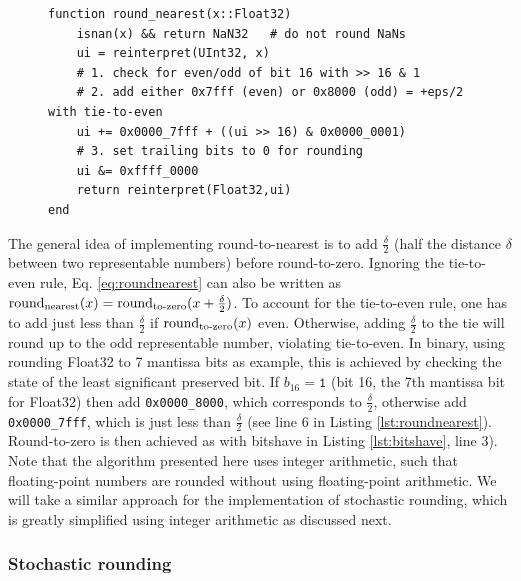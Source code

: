 \begin{figure}[tbhp]
\begin{lstlisting}[language=JuliaLocal, label=lst:roundnearest, caption={\textbf{Efficient round-to-nearest implemented with integer arithmetic.}
Example algorithm rounding Float32 to 7 mantissa bits as in Listing \ref{lst:bitshave}. Algorithm adapted from the open-source package
\href{https://github.com/milankl/BFloat16s.jl}{BFloat16s.jl}}]
function round_nearest(x::Float32)
    isnan(x) && return NaN32   # do not round NaNs
    ui = reinterpret(UInt32, x)
    # 1. check for even/odd of bit 16 with >> 16 & 1
    # 2. add either 0x7fff (even) or 0x8000 (odd) = +eps/2 with tie-to-even
    ui += 0x0000_7fff + ((ui >> 16) & 0x0000_0001)
    # 3. set trailing bits to 0 for rounding
    ui &= 0xffff_0000
    return reinterpret(Float32,ui)
end
\end{lstlisting}
\end{figure}
The general idea of implementing round-to-nearest is to add $\tfrac{\delta}{2}$ (half the distance $\delta$ between two representable numbers) before round-to-zero.
Ignoring the tie-to-even rule, Eq. \ref{eq:roundnearest} can also be written as $\operatorname{round}_{\operatorname{nearest}}(x) = \operatorname{round}_{\operatorname{to-zero}}(x + \tfrac{\delta}{2})$.
To account for the tie-to-even rule, one has to add just less than $\tfrac{\delta}{2}$ if $\operatorname{round}_{\operatorname{to-zero}}(x)$ even. Otherwise, adding $\tfrac{\delta}{2}$
to the tie will round up to the odd representable number, violating tie-to-even. In binary, using rounding Float32 to 7 mantissa bits as example, this is achieved
by checking the state of the least significant preserved bit. If $b_{16} = \mathtt{1}$ (bit 16, the 7th mantissa bit for Float32) then add \texttt{0x0000\_8000},
which corresponds to $\tfrac{\delta}{2}$, otherwise add \texttt{0x0000\_7fff}, which is just less than $\tfrac{\delta}{2}$ (see line 6 in Listing \ref{lst:roundnearest}).
Round-to-zero is then achieved as with bitshave in Listing \ref{lst:bitshave}, line 3). Note that the algorithm presented here uses integer arithmetic, such that
floating-point numbers are rounded without using floating-point arithmetic. We will take a similar approach for the implementation of stochastic rounding,
which is greatly simplified using integer arithmetic as discussed next.

\subsubsection{Stochastic rounding}


